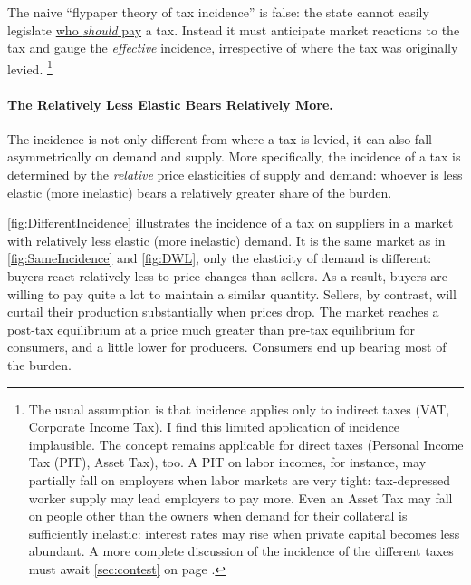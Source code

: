 The naive ``flypaper theory of tax incidence'' is false:
the state cannot easily legislate \href{sec:RedistributionIsPersonal}{who \emph{should} pay} a tax.
Instead it must anticipate market reactions to the tax and gauge the \emph{effective} incidence, irrespective of where the tax was originally levied.
\footnote{
	The usual assumption is that incidence applies only to indirect taxes (VAT, Corporate Income Tax).
	I find this limited application of incidence implausible.
	The concept remains applicable for direct taxes (Personal Income Tax (PIT), Asset Tax), too.
	A PIT on labor incomes, for instance, may partially fall on employers when labor markets are very tight:
	tax-depressed worker supply may lead employers to pay more.
	Even an Asset Tax may fall on people other than the owners when demand for their collateral is sufficiently inelastic:
	interest rates may rise when private capital becomes less abundant.
	A more complete discussion of the incidence of the different taxes must await \autoref{sec:contest} on page \pageref{sec:contest}.
}

\paragraph{The Relatively Less Elastic Bears Relatively More.}
The incidence is not only different from where a tax is levied, it can also fall asymmetrically on demand and supply.
More specifically, the incidence of a tax is determined by the \emph{relative} price elasticities of supply and demand:
whoever is less elastic (more inelastic) bears a relatively greater share of the burden.

\autoref{fig:DifferentIncidence} illustrates the incidence of a tax on suppliers in a market with relatively less elastic (more inelastic) demand.
It is the same market as in \autoref{fig:SameIncidence} and \ref{fig:DWL}, only the elasticity of demand is different:
buyers react relatively less to price changes than sellers.
As a result, buyers are willing to pay quite a lot to maintain a similar quantity.
Sellers, by contrast, will curtail their production substantially when prices drop.
The market reaches a post-tax equilibrium at a price much greater than pre-tax equilibrium for consumers, and a little lower for producers.
Consumers end up bearing most of the burden.



